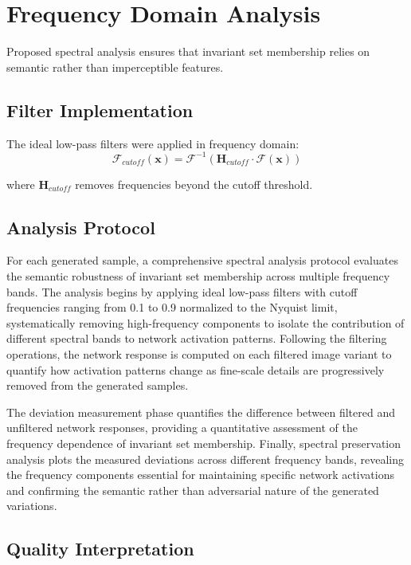 \section{Frequency Domain Analysis}\label{appendix:frequency_analysis}

Proposed spectral analysis ensures that invariant set membership relies on semantic rather than imperceptible features.

\subsection{Filter Implementation}

The ideal low-pass filters were applied in frequency domain:
\begin{equation}
\mathcal{F}_{cutoff}(\mathbf{x}) = \mathcal{F}^{-1}(\mathbf{H}_{cutoff} \cdot \mathcal{F}(\mathbf{x}))
\end{equation}

where $\mathbf{H}_{cutoff}$ removes frequencies beyond the cutoff threshold.

\subsection{Analysis Protocol}

For each generated sample, a comprehensive spectral analysis protocol evaluates the semantic robustness of invariant set membership across multiple frequency bands. The analysis begins by applying ideal low-pass filters with cutoff frequencies ranging from 0.1 to 0.9 normalized to the Nyquist limit, systematically removing high-frequency components to isolate the contribution of different spectral bands to network activation patterns. Following the filtering operations, the network response is computed on each filtered image variant to quantify how activation patterns change as fine-scale details are progressively removed from the generated samples.

The deviation measurement phase quantifies the difference between filtered and unfiltered network responses, providing a quantitative assessment of the frequency dependence of invariant set membership. Finally, spectral preservation analysis plots the measured deviations across different frequency bands, revealing the frequency components essential for maintaining specific network activations and confirming the semantic rather than adversarial nature of the generated variations.

\subsection{Quality Interpretation}

